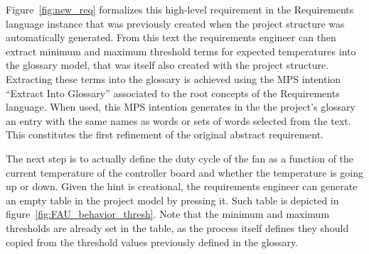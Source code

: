 Figure~\ref{fig:new_req} formalizes this high-level requirement in
the \textsf{Requirements} language instance that was previously created when the 
project structure was automatically generated. From this text the requirements engineer can then
extract minimum and maximum threshold terms for expected temperatures into
the glossary model, that was itself also created with the project structure.
Extracting these terms into the glossary is achieved using the
MPS intention ``Extract Into Glossary'' associated to the root concepts of the
\textsf{Requirements} language. When used, this MPS intention generates in the
the project's glossary an entry with the same names as words
or sets of words selected from the text. This constitutes the first refinement
of the original abstract requirement.


% 

The next step is to actually define the duty cycle of the fan as a function
of the current temperature of the controller board and whether the temperature
is going up or down. 
Given the hint is creational, the requirements engineer can generate an empty
table in the project model by pressing it. Such table is depicted in
figure~\ref{fig:FAU_behavior_thresh}.
Note that the minimum and maximum thresholds are already set in the table, as
the process itself defines they should copied from the threshold values
previously defined in the glossary.

